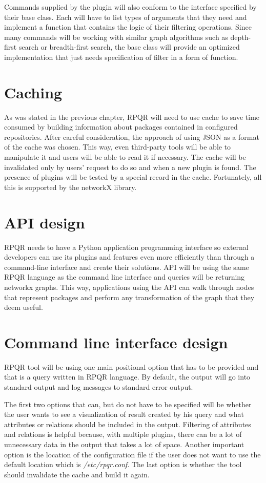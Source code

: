 Commands supplied by the plugin will also conform to the interface specified by their base class. Each
will have to list types of arguments that they need and implement a function that contains the logic of
their filtering operations. Since many commands will be working with similar graph algorithms such as
depth-first search or breadth-first search, the base class will provide an optimized implementation that
just needs specification of filter in a form of function.

\section{Caching}

As was stated in the previous chapter, RPQR will need to use cache to save time consumed by building information
about packages contained in configured repositories. After careful consideration, the approach of
using JSON as a format of the cache was chosen. This way, even third-party tools will be able to manipulate
it and users will be able to read it if necessary. The cache will be invalidated only by users'
request to do so and when a new plugin is found. The presence of plugins will be tested by a special record
in the cache. Fortunately, all this is supported by the networkX library.

\section{API design}
RPQR needs to have a Python application programming interface so external developers can use its plugins
and features even more efficiently than through a command-line interface and create their solutions.
API will be using the same RPQR language as the command line interface and queries will be returning
networkx graphs. This way, applications using the API can walk through nodes that represent packages
and perform any transformation of the graph that they deem useful.

\newpage

\section{Command line interface design}
RPQR tool will be using one main positional option that has to be provided and that is a query written
in RPQR language. By default, the output will go into standard output and log messages to standard error output.

The first two options that can, but do not have to be specified will be whether the user wants to see a visualization
of result created by his query and what attributes or relations should be included in the output.
Filtering of attributes and relations is helpful because, with multiple plugins, there can be a lot
of unnecessary data in the output that takes a lot of space. Another important option is the location
of the configuration file if the user does not want to use the default location which is \textit{/etc/rpqr.conf}.
The last option is whether the tool should invalidate the cache and build it again.

